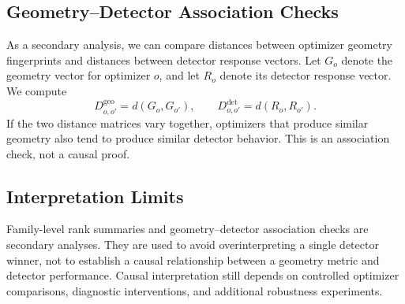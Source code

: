 \subsection{Geometry--Detector Association Checks}
\label{app:geometry-detector-association}

As a secondary analysis, we can compare distances between optimizer geometry
fingerprints and distances between detector response vectors. Let \(G_o\) denote
the geometry vector for optimizer \(o\), and let \(R_o\) denote its detector
response vector. We compute
\[
    D^{\mathrm{geo}}_{o,o'}
    =
    d(G_o,G_{o'}),
    \qquad
    D^{\mathrm{det}}_{o,o'}
    =
    d(R_o,R_{o'}).
\]
If the two distance matrices vary together, optimizers that produce similar
geometry also tend to produce similar detector behavior. This is an association
check, not a causal proof.

\subsection{Interpretation Limits}
\label{app:statistical-interpretation-limits}

Family-level rank summaries and geometry--detector association checks are
secondary analyses. They are used to avoid overinterpreting a single detector
winner, not to establish a causal relationship between a geometry metric and
detector performance. Causal interpretation still depends on controlled
optimizer comparisons, diagnostic interventions, and additional robustness
experiments.
